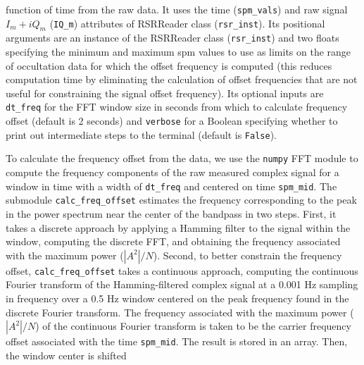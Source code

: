 \documentclass[titlepage, 12pt]{article}
\begin{document}
                function of time from the raw data. It uses the time
                (\texttt{spm\_vals}) and raw signal $I_m+iQ_m$ (\texttt{IQ\_m})
                attributes of RSRReader class (\texttt{rsr\_inst}). Its
                positional arguments are an instance of the RSRReader class
                (\texttt{rsr\_inst}) and two floats specifying the minimum and
                maximum \gls{spm} values to use as limits on the range of occultation
                data for which the offset frequency is computed (this reduces
                computation time by eliminating the calculation of offset
                frequencies that are not useful for constraining the signal offset
                frequency). Its optional inputs are \texttt{dt\_freq}
                for the FFT window size in seconds from which to calculate
                frequency offset (default is 2 seconds) and
                \texttt{verbose} for a Boolean specifying whether to print out
                intermediate steps to the terminal (default is \texttt{False}).
                \par\hfill\par
                To calculate the frequency offset from the data, we use the
                \texttt{numpy} FFT module to compute the frequency components of
                the raw measured complex signal for a window in time with a width
                of \texttt{dt\_freq} and centered on time \texttt{spm\_mid}. The submodule \texttt{calc\_freq\_offset}
                estimates the frequency corresponding to the peak in the power
                spectrum near the center of the bandpass in two
                steps. First, it takes a discrete approach by applying a Hamming
                filter to the signal within the window, computing the
                discrete FFT, and obtaining the frequency associated
                with the maximum power ($|A^2|/N$). Second, to better
                constrain the frequency offset,
                \texttt{calc\_freq\_offset} takes a continuous
                approach, computing the
                continuous Fourier transform of the Hamming-filtered complex signal
                at a 0.001 Hz sampling in frequency over
                a 0.5 Hz window centered on the peak frequency
                found in the discrete Fourier transform. The
                frequency associated with the maximum power
                ($|A^2|/N$) of the continuous Fourier transform is taken to be the carrier frequency offset associated with the time \texttt{spm\_mid}. The
                result is stored in an array. Then, the window center is shifted
\end{document}
